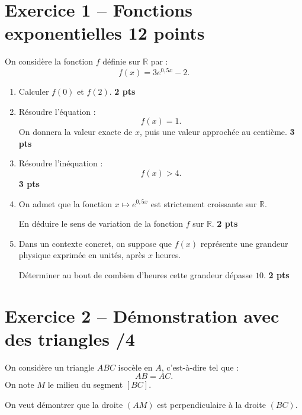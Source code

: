 \documentclass[11pt,a4paper]{article}
\begin{document}
\vspace{1.2em}

\section*{Exercice 1 -- Fonctions exponentielles \hfill \textnormal{12 points}}

On considère la fonction $f$ définie sur $\mathbb{R}$ par :
\[
f(x)=3e^{0,5x}-2.
\]

\begin{enumerate}
    \item Calculer $f(0)$ et $f(2)$. \hfill \textbf{2 pts}

    \item Résoudre l’équation :
    \[
    f(x)=1.
    \]
    On donnera la valeur exacte de $x$, puis une valeur approchée au centième. \hfill \textbf{3 pts}

    \item Résoudre l’inéquation :
    \[
    f(x)>4.
    \]
    \hfill \textbf{3 pts}

    \item On admet que la fonction $x \mapsto e^{0,5x}$ est strictement croissante sur $\mathbb{R}$.

    En déduire le sens de variation de la fonction $f$ sur $\mathbb{R}$. \hfill \textbf{2 pts}

    \item Dans un contexte concret, on suppose que $f(x)$ représente une grandeur physique exprimée en unités, après $x$ heures.

    Déterminer au bout de combien d’heures cette grandeur dépasse $10$. \hfill \textbf{2 pts}
\end{enumerate}

\section*{Exercice 2 -- Démonstration avec des triangles \hfill /4}

On considère un triangle \(ABC\) isocèle en \(A\), c'est-à-dire tel que :
\[
AB=AC.
\]
On note \(M\) le milieu du segment \([BC]\).

On veut démontrer que la droite \((AM)\) est perpendiculaire à la droite \((BC)\).
\end{document}
